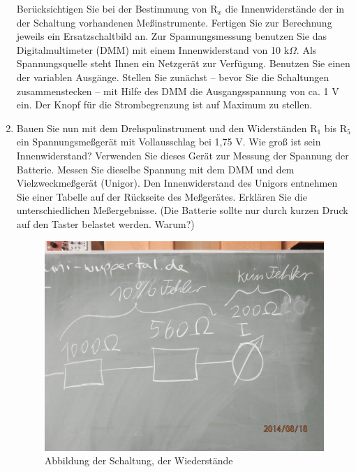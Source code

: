 \documentclass[12pt]{scrartcl}
\begin{document}
\begin{enumerate}
	Berücksichtigen Sie bei 	der Bestimmung 			von $\text{R}_x$ die Innenwiderstände 			der in der Schaltung vorhandenen 				Meßinstrumente. Fertigen Sie zur 				Berechnung jeweils ein Ersatzschaltbild 			an. Zur Spannungsmessung benutzen Sie 			das Digitalmultimeter (DMM) mit einem 			Innenwiderstand von 10 k$\Omega$. Als 			Spannungsquelle steht Ihnen ein 					Netzgerät zur Verfügung. Benutzen Sie 			einen der variablen Ausgänge. Stellen 			Sie zunächst -- bevor Sie die 					Schaltungen 	zusammenstecken -- mit Hilfe 	des DMM die Ausgangsspannung von ca. 			1 V ein. Der Knopf für die 						Strombegrenzung ist auf Maximum zu 				stellen.
	\item
	Bauen Sie nun mit dem Drehspulinstrument 	und den Widerständen $\text{R}_1$ bis 			$\text{R}_5$ ein Spannungsmeßgerät mit 			Vollausschlag bei 1,75 V. Wie groß ist 			sein Innenwiderstand? Verwenden Sie 				dieses Gerät zur Messung der Spannung 			der Batterie. Messen Sie dieselbe 				Spannung mit dem DMM und dem 					Vielzweckmeßgerät (Unigor). Den 					Innenwiderstand des Unigors entnehmen 			Sie einer Tabelle auf der Rückseite des 			Meßgerätes. Erklären Sie die 					unterschiedlichen Meßergebnisse.
	(Die Batterie sollte nur durch 					kurzen Druck auf den Taster belastet 			werden. Warum?)
	
\begin{figure}[htbp] 
	  \centering
	    \includegraphics[scale = 0.1]{tafel_2.JPG}
	  	\caption[Abbildung der Schaltung, der Wiederstände]{Abbildung der Schaltung, der Wiederstände}
	  \label{fig:tafel_2}
	\end{figure}	
	

\end{enumerate}
\end{document}
